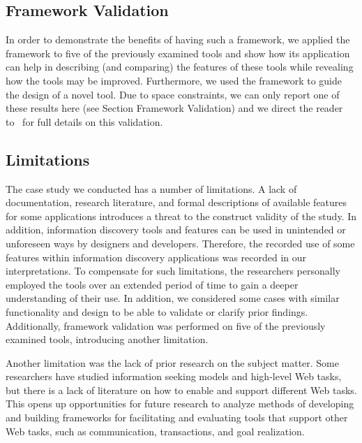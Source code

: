 \documentclass{sigchi}
\begin{document}
{\subsection{Framework Validation}
\label{subsection:validating}
In order to demonstrate the benefits of having such a framework, we applied the framework to five of the previously examined tools and show how its application can help in describing (and comparing) the features of these tools while revealing how the tools may be improved. Furthermore, we used the framework to guide the design of a novel tool.  Due to space constraints, we can only report one of these results here (see Section Framework Validation) and we direct the reader to~\cite{voyloshnikova2015} for full details on this validation.    

{\subsection{Limitations}
The case study we conducted has a number of limitations. A lack of documentation, research literature, and formal descriptions of available features for some applications introduces a threat to the construct validity of the study. In addition, information discovery tools and features can be used in unintended or unforeseen ways by designers and developers. Therefore, the recorded use of some features within information discovery applications was recorded in our interpretations. To compensate for such limitations, the researchers personally employed the tools over an extended period of time to gain a deeper understanding of their use. In addition, we considered some cases with similar functionality and design to be able to validate or clarify prior findings. 
Additionally, framework validation was performed on five of the previously examined tools, introducing another limitation. 
%

Another limitation was the lack of prior research on the subject matter. Some researchers have studied information seeking models and high-level Web tasks, but there is a lack of literature on how to enable and support different Web tasks. This opens up opportunities for future research to analyze methods of developing and building frameworks for facilitating and evaluating tools that support other Web tasks, such as communication, transactions, and goal realization.
}
}
\end{document}

